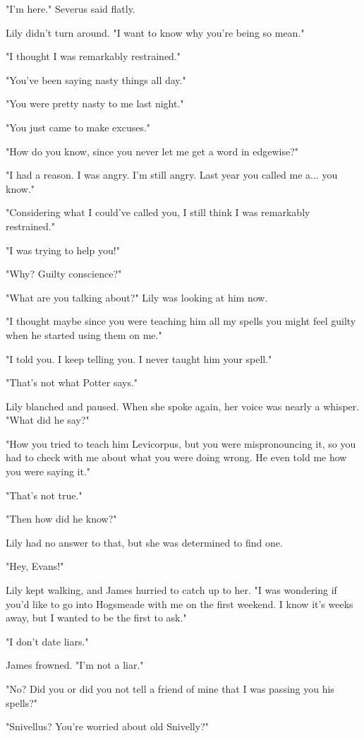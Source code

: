 "I'm here." Severus said flatly.

Lily didn't turn around. "I want to know why you're being so mean."

"I thought I was remarkably restrained."

"You've been saying nasty things all day."

"You were pretty nasty to me last night."

"You just came to make excuses."

"How do you know, since you never let me get a word in edgewise?"

"I had a reason. I was angry. I'm still angry. Last year you called me a... you know."

"Considering what I could've called you, I still think I was remarkably restrained."

"I was trying to help you!"

"Why? Guilty conscience?"

"What are you talking about?" Lily was looking at him now.

"I thought maybe since you were teaching him all my spells you might feel guilty when he started using them on me."

"I told you. I keep telling you. I never taught him your spell."

"That's not what Potter says."

Lily blanched and paused. When she spoke again, her voice was nearly a whisper. "What did he say?"

"How you tried to teach him Levicorpus, but you were mispronouncing it, so you had to check with me about what you were doing wrong. He even told me how you were saying it."

"That's not true."

"Then how did he know?"

Lily had no answer to that, but she was determined to find one.

"Hey, Evans!"

Lily kept walking, and James hurried to catch up to her. "I was wondering if you'd like to go into Hogsmeade with me on the first weekend. I know it's weeks away, but I wanted to be the first to ask."

"I don't date liars."

James frowned. "I'm not a liar."

"No? Did you or did you not tell a friend of mine that I was passing you his spells?"

"Snivellus? You're worried about old Snivelly?"

